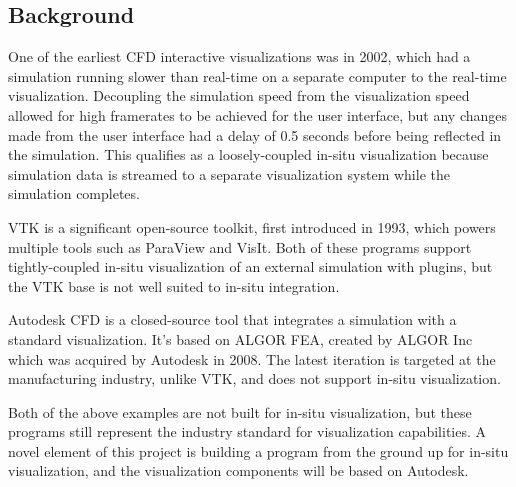 \subsection{Background}




One of the earliest CFD interactive visualizations was in 2002, which had a simulation running slower than real-time on a separate computer to the real-time visualization\cite{paper:2002vis:10.5555/509740.509745}.
Decoupling the simulation speed from the visualization speed allowed for high framerates to be achieved for the user interface, but any changes made from the user interface had a delay of 0.5 seconds before being reflected in the simulation.
This qualifies as a loosely-coupled in-situ visualization because simulation data is streamed to a separate visualization system while the simulation completes.

VTK is a significant open-source toolkit, first introduced in 1993\cite{VTKBook}, which powers multiple tools such as ParaView and VisIt.
Both of these programs support tightly-coupled in-situ visualization of an external simulation with plugins, but the VTK base is not well suited to in-situ integration\cite{kress2017situ}.

Autodesk CFD is a closed-source tool that integrates a simulation with a standard visualization.%
It's based on ALGOR FEA, created by ALGOR Inc which was acquired by Autodesk in 2008\cite{AutodeskAcquiresALGOR}.
The latest iteration is targeted at the manufacturing industry, unlike VTK, and does not support in-situ visualization.

Both of the above examples are not built for in-situ visualization, but these programs still represent the industry standard for visualization capabilities.
A novel element of this project is building a program from the ground up for in-situ visualization, and the visualization components will be based on Autodesk.